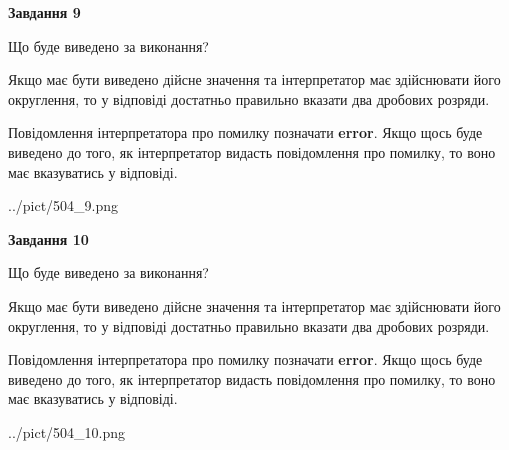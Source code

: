 \documentclass[12pt, ukrainian]{article}
\begin{document}
{\begin {Large}
{\begin {center}\textbf{Завдання 9}\end {center}}\par
Що буде виведено за виконання? \par

Якщо має бути виведено дійсне значення та інтерпретатор має здійснювати його округлення, 
то у відповіді достатньо правильно вказати два дробових розряди.

Повідомлення інтерпретатора про помилку позначати \textbf{error}.
Якщо щось буде виведено до того, як інтерпретатор видасть повідомлення про помилку, 
то воно має вказуватись у відповіді. \par

\begin{center}
	{../pict/504_9.png}
\end{center}
\newpage

{\begin {center}\textbf{Завдання 10}\end {center}}\par
Що буде виведено за виконання? \par

Якщо має бути виведено дійсне значення та інтерпретатор має здійснювати його округлення, 
то у відповіді достатньо правильно вказати два дробових розряди.

Повідомлення інтерпретатора про помилку позначати \textbf{error}.
Якщо щось буде виведено до того, як інтерпретатор видасть повідомлення про помилку, 
то воно має вказуватись у відповіді. \par

\begin{center}
	{../pict/504_10.png}
\end{center}
\newpage

\end {Large}}
\end{document}
